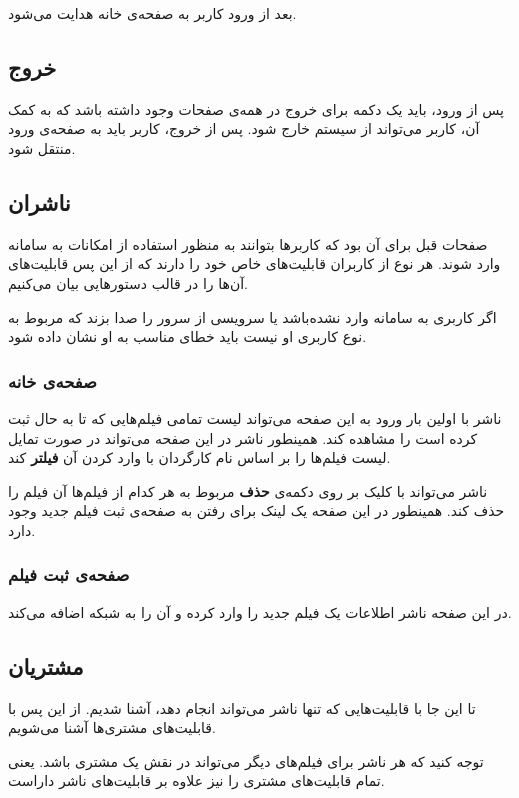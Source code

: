 \documentclass{utap}
\begin{document}
	بعد از ورود کاربر به صفحه‌ی خانه هدایت می‌شود.

	
	\subsection{خروج}
	پس از ورود، باید یک دکمه برای خروج در همه‌ی صفحات وجود داشته باشد که به کمک آن، کاربر می‌تواند از سیستم خارج شود. پس از خروج، کاربر باید به صفحه‌ی ورود منتقل شود.
	
	
	
	\subsection{ناشران}
	صفحات قبل برای آن بود که کاربر‌ها بتوانند به منظور استفاده از امکانات به سامانه‌ وارد شوند. هر نوع از کاربران قابلیت‌های خاص خود  را دارند که از این پس قابلیت‌های آن‌ها را در قالب دستورهایی بیان می‌کنیم.
	
		اگر کاربری به سامانه وارد نشده‌باشد یا سرویسی از سرور را صدا بزند که مربوط به نوع کاربری او نیست باید خطای مناسب به او نشان داده شود.
		
		\subsubsection{صفحه‌ی خانه} 
		ناشر با اولین بار ورود به این صفحه می‌تواند لیست تمامی فیلم‌هایی که تا به حال ثبت کرده است را مشاهده کند. همینطور ناشر در این صفحه می‌تواند در صورت تمایل لیست‌ فیلم‌ها را بر اساس نام کارگردان با وارد کردن آن \textbf{فیلتر} کند. 
		
		
		ناشر می‌تواند با کلیک بر روی دکمه‌ی \textbf{حذف} مربوط به هر کدام از فیلم‌ها آن فیلم را حذف کند. 
		همینطور در این صفحه یک لینک برای رفتن به صفحه‌ی ثبت فیلم جدید وجود دارد.
		
		 \subsubsection{صفحه‌ی ثبت فیلم}
	در این صفحه ناشر اطلاعات یک فیلم جدید را وارد کرده و آن را به شبکه اضافه می‌کند.   
	
	\subsection{مشتریان}
	تا این جا با قابلیت‌هایی که تنها ناشر می‌تواند انجام دهد، آشنا شدیم.
	از این پس با قابلیت‌های مشتری‌ها آشنا می‌شویم.
	
	توجه کنید که هر ناشر برای فیلم‌های دیگر می‌تواند در نقش یک مشتری باشد.
	یعنی تمام قابلیت‌های مشتری را نیز علاوه بر قابلیت‌های ناشر داراست.
	
\end{document}
